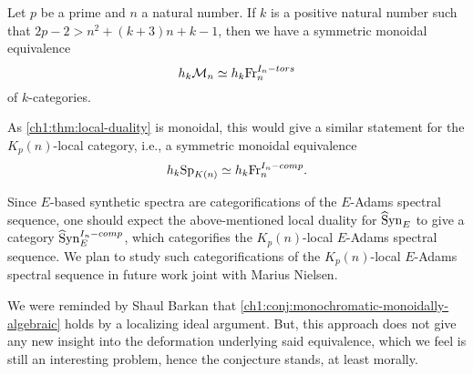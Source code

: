 \begin{conjecture}
    \label{ch1:conj:monochromatic-monoidally-algebraic}
    Let $p$ be a prime and $n$ a natural number. If $k$ is a positive natural number such that $2p-2>n^2+(k+3)n+k-1$, then we have a symmetric monoidal equivalence 
    \[h_k \mathcal{M}_{n}\simeq h_k \mathrm{Fr}_{n}^{I_n-tors}\]
    of $k$-categories. 
\end{conjecture}

As \cref{ch1:thm:local-duality} is monoidal, this would give a similar statement for the $K_p(n)$-local category, i.e., a symmetric monoidal equivalence 
\[h_k \mathrm{Sp}_{K(n)}\simeq h_k \mathrm{Fr}_{n}^{I_n-comp}.\]

Since $E$-based synthetic spectra are categorifications of the $E$-Adams spectral sequence, one should expect the above-mentioned local duality for $\widehat{\mathrm{S}}\mathrm{yn}_{E}$ to give a category $\widehat{\mathrm{S}}\mathrm{yn}_{E}^{I_n-comp}$, which categorifies the $K_p(n)$-local $E$-Adams spectral sequence. We plan to study such categorifications of the $K_p(n)$-local $E$-Adams spectral sequence in future work joint with Marius Nielsen. 

\begin{addendum}
    We were reminded by Shaul Barkan that \cref{ch1:conj:monochromatic-monoidally-algebraic} holds by a localizing ideal argument. But, this approach does not give any new insight into the deformation underlying said equivalence, which we feel is still an interesting problem, hence the conjecture stands, at least morally. 
\end{addendum}